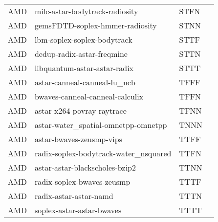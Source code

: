 \begin{table}[htb]
\begin{tabular}{@{}lllr@{}}
            AMD & milc-astar-bodytrack-radiosity              & STFN \\
            AMD & gemsFDTD-soplex-hmmer-radiosity             & STNN\\
            AMD & lbm-soplex-soplex-bodytrack                 & STTF \\
            AMD & dedup-radix-astar-freqmine                  & STTN \\
            AMD & libquantum-astar-astar-radix                & STTT \\
            AMD & astar-canneal-canneal-lu\_ncb               & TFFF \\
            AMD & bwaves-canneal-canneal-calculix             & TFFN \\
            AMD & astar-x264-povray-raytrace                  & TFNN \\
            AMD & astar-water\_spatial-omnetpp-omnetpp        & TNNN \\
            AMD & astar-bwaves-zeusmp-vips                    & TTFF \\
            AMD & radix-soplex-bodytrack-water\_nsquared      & TTFN \\
            AMD & astar-astar-blackscholes-bzip2              & TTNN \\
            AMD & radix-soplex-bwaves-zeusmp                  & TTTF \\ 
            AMD & radix-astar-astar-namd                      & TTTN \\
            AMD & soplex-astar-astar-bwaves                   & TTTT \\
        \bottomrule
    \end{tabular}
    \label{tab: classes-AMD}
\end{table}
    

